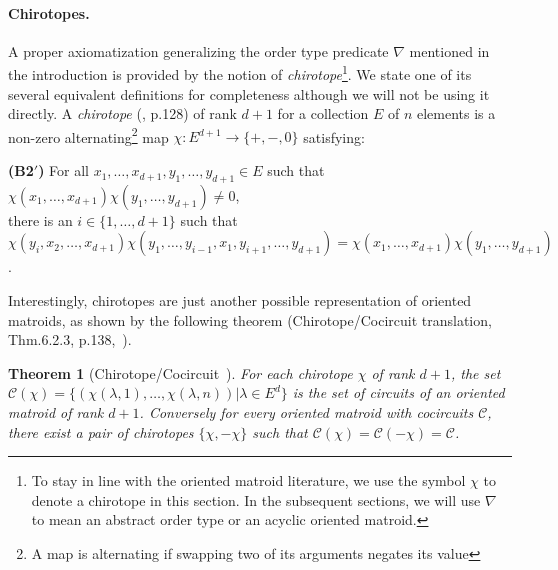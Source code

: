 \documentclass[leqno,12pt]{article}
\def\C{\mathcal{C}}
\newtheorem{theorem}{Theorem}
\begin{document}
\paragraph{Chirotopes.}
A proper axiomatization generalizing the order type predicate $\nabla$
mentioned in the introduction is provided by the notion of
\emph{chirotope}\footnote{To stay in line with the oriented matroid
  literature, we use the symbol $\chi$ to denote a chirotope in this
  section. In the subsequent sections, we will use $\nabla$ to mean an
abstract order type or an acyclic oriented matroid.}. 
We state one of its several equivalent definitions
for completeness although we will not be using it directly.
A \emph{chirotope} (\cite{Bjorner:Oriented}, p.128) of rank $d{+}1$ for a collection $E$ of $n$ elements is
a non-zero alternating\footnote{A map is alternating if swapping two
  of its arguments negates its value} map 
$\chi: E^{d+1} \rightarrow \{+,-,0\}$ 
satisfying:

\vspace{3mm}
{\noindent\bf(B2$'$)}  For all $x_1,\ldots,x_{d+1},y_1,\ldots,y_{d+1}\in E$  such that
$\chi(x_1,\ldots,x_{d+1}) \chi(y_1,\ldots,y_{d+1})\neq 0$,\\
there is an $i \in \{1,\ldots,{d+1}\}$ such that\\
$\chi(y_i,x_2,\ldots,x_{d+1}) \chi(y_1,\ldots,y_{i-1},x_1,y_{i+1},\ldots,y_{d+1}) =
 \chi(x_1,\ldots,x_{d+1}) \chi(y_1,\ldots,y_{d+1})$.
\vspace{3mm}

\noindent Interestingly, chirotopes are just another possible
representation of oriented matroids, as shown by the following theorem
(Chirotope/Cocircuit translation, Thm.6.2.3,
p.138,~\cite{go-hdcg-04}).

\begin{theorem}[Chirotope/Cocircuit~\cite{go-hdcg-04}]
For each chirotope $\chi$ of rank $d{+}1$, the set
$\C(\chi) = \{(\chi(\lambda,1),\ldots,\chi(\lambda,n)) | \lambda\in E^{d}\}$
is the set of circuits of an oriented matroid of rank $d+1$. Conversely for every
oriented matroid with cocircuits $\C$, there exist a pair of
chirotopes $\{\chi,-\chi\}$ such that $\C(\chi) = \C(-\chi) = \C$. 
\end{theorem} 
\end{document}
